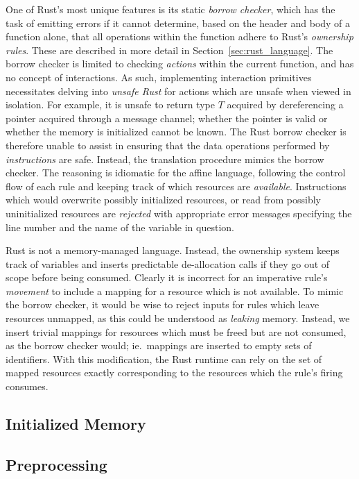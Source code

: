 One of Rust's most unique features is its static \textit{borrow checker}, which has the task of emitting errors if it cannot determine, based on the header and body of a function alone, that all operations within the function adhere to Rust's \textit{ownership rules}. These are described in more detail in Section~\ref{sec:rust_language}. The borrow checker is limited to checking \textit{actions} within the current function, and has no concept of interactions. As such, implementing interaction primitives necessitates delving into \textit{unsafe Rust} for actions which are unsafe when viewed in isolation. For example, it is unsafe to return type $T$ acquired by dereferencing a pointer acquired through a message channel; whether the pointer is valid or whether the memory is initialized cannot be known. The Rust borrow checker is therefore unable to assist in ensuring that the data operations performed by \textit{instructions} are safe. Instead, the translation procedure mimics the borrow checker. The reasoning is idiomatic for the affine language, following the control flow of each rule and keeping track of which resources are \textit{available}. Instructions which would overwrite possibly initialized resources, or read from possibly uninitialized resources are \textit{rejected} with appropriate error messages specifying the line number and the name of the variable in question. 

Rust is not a memory-managed language. Instead, the ownership system keeps track of variables and inserts predictable de-allocation calls if they go out of scope before being consumed. Clearly it is incorrect for an imperative rule's \textit{movement} to include a mapping for a resource which is not available. 
To mimic the borrow checker, it would be wise to reject inputs for rules which leave resources unmapped, as this could be understood as \textit{leaking} memory. Instead, we insert trivial mappings for resources which must be freed but are not consumed, as the borrow checker would; ie.\ mappings are inserted to empty sets of identifiers. With this modification, the Rust runtime can rely on the set of mapped resources exactly corresponding to the resources which the rule's firing consumes.


\subsection{Initialized Memory}
\subsection{Preprocessing}